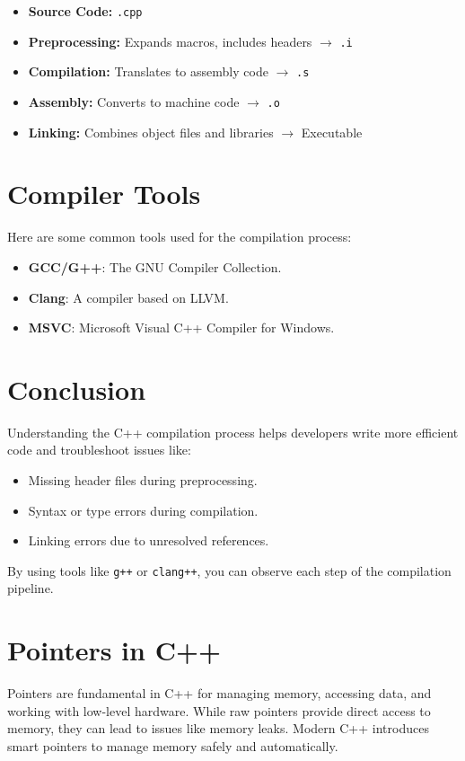 
\begin{itemize}
    \item \textbf{Source Code:} \texttt{.cpp}
    \item \textbf{Preprocessing:} Expands macros, includes headers $\rightarrow$ \texttt{.i}
    \item \textbf{Compilation:} Translates to assembly code $\rightarrow$ \texttt{.s}
    \item \textbf{Assembly:} Converts to machine code $\rightarrow$ \texttt{.o}
    \item \textbf{Linking:} Combines object files and libraries $\rightarrow$ Executable
\end{itemize}

\section{Compiler Tools}
Here are some common tools used for the compilation process:
\begin{itemize}
    \item \textbf{GCC/G++}: The GNU Compiler Collection.
    \item \textbf{Clang}: A compiler based on LLVM.
    \item \textbf{MSVC}: Microsoft Visual C++ Compiler for Windows.
\end{itemize}

\section{Conclusion}
Understanding the C++ compilation process helps developers write more efficient code and troubleshoot issues like:
\begin{itemize}
    \item Missing header files during preprocessing.
    \item Syntax or type errors during compilation.
    \item Linking errors due to unresolved references.
\end{itemize}

By using tools like \texttt{g++} or \texttt{clang++}, you can observe each step of the compilation pipeline.


\section{Pointers in C++}
Pointers are fundamental in C++ for managing memory, accessing data, and working with low-level hardware. While raw pointers provide direct access to memory, they can lead to issues like memory leaks. Modern C++ introduces smart pointers to manage memory safely and automatically.

